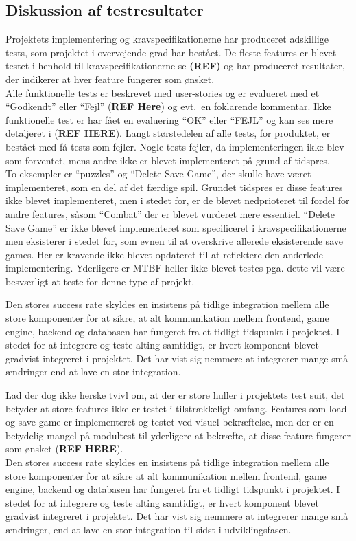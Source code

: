 \subsection{Diskussion af testresultater}
Projektets implementering og kravspecifikationerne har produceret adskillige tests, som 
projektet i overvejende grad har bestået. De fleste features er blevet
testet i henhold til kravspecifikationerne se \textbf{(REF)} og har produceret 
resultater, der indikerer at hver feature fungerer som ønsket. \\

Alle funktionelle tests er beskrevet med user-stories og er evalueret med et ``Godkendt''
eller ``Fejl'' (\textbf{REF Here}) og evt.\ en foklarende kommentar. Ikke funktionelle 
test er har fået en evaluering ``OK'' eller ``FEJL'' og kan ses mere detaljeret i (\textbf{REF HERE}).
Langt størstedelen af alle tests, for produktet, er bestået med få tests som fejler. 
Nogle tests fejler, da implementeringen ikke blev som forventet, mens andre ikke er blevet 
implementeret på grund af tidspres. \\

To eksempler er ``puzzles'' og ``Delete Save Game'', der skulle have været implementeret, som en del af det færdige spil.
Grundet tidspres er disse features ikke blevet implementeret, men i stedet for, er de blevet
nedprioteret til fordel for andre features, såsom ``Combat'' der er blevet vurderet mere essentiel.
``Delete Save Game'' er ikke blevet implementeret som specificeret i kravspecifikationerne men
eksisterer i stedet for, som evnen til at overskrive allerede eksisterende save games. Her er 
kravende ikke blevet opdateret til at reflektere den anderlede implementering. Yderligere er MTBF heller ikke blevet testes pga. dette vil være besværligt at teste for denne type af projekt.

Den stores success rate skyldes en insistens på tidlige integration mellem alle store komponenter for at sikre, at 
alt kommunikation mellem frontend, game engine, backend og databasen har fungeret fra et tidligt 
tidspunkt i projektet. I stedet for at integrere og teste alting samtidigt, er hvert komponent 
blevet gradvist integreret i projektet. Det har vist sig nemmere at integrerer mange små ændringer
end at lave en stor integration.

Lad der dog ikke herske tvivl om, at der er store huller i projektets test suit, det
betyder at store features ikke er testet i tilstrækkeligt omfang. Features som load- og save game er implementeret og testet ved visuel bekræftelse, men der er en betydelig mangel på modultest til yderligere at bekræfte, at disse feature fungerer som ønsket (\textbf{REF HERE}). \\

Den stores success rate skyldes en insistens på tidlige integration mellem alle store komponenter for at sikre at alt kommunikation mellem frontend, game engine, backend og databasen har fungeret fra et tidligt tidspunkt i projektet.
I stedet for at integrere og teste alting samtidigt, er hvert komponent blevet gradvist integreret i projektet. Det har vist sig nemmere at integrerer mange små ændringer, end at lave en stor integration til sidst i udviklingsfasen.


